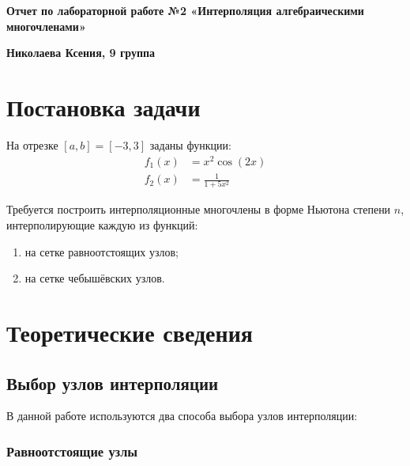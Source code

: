 \documentclass[12pt]{article}
\begin{document}
\begin{titlepage}
    \begin{center}
        \vspace*{\fill}
        
        \textbf{\LARGE Отчет по лабораторной работе №2 «Интерполяция алгебраическими многочленами»}
        
        \vspace{0.5cm}
        
        \textbf{\Large  Николаева Ксения, 9 группа}
        
        
        \vfill
        
    \end{center}
\end{titlepage}

\tableofcontents
\newpage

\section{Постановка задачи}

На отрезке $[a, b] = [-3, 3]$ заданы функции:
\begin{align}
    f_1(x) &= x^2\cos(2x)\\
    f_2(x) &= \frac{1}{1 + 5x^2}
\end{align}

Требуется построить интерполяционные многочлены в форме Ньютона степени $n$, интерполирующие каждую из функций:
\begin{enumerate}
    \item на сетке равноотстоящих узлов;
    \item на сетке чебышёвских узлов.
\end{enumerate}

\section{Теоретические сведения}

\subsection{Выбор узлов интерполяции}

В данной работе используются два способа выбора узлов интерполяции:

\subsubsection{Равноотстоящие узлы}
\end{document}
